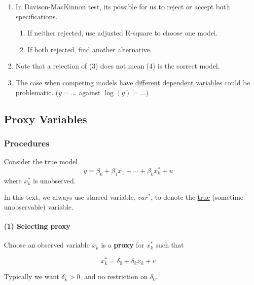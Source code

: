 \documentclass[]{article}
\begin{document}
			\begin{remark}[Porblems] \quad
				\begin{enumerate}
					\item In Davison-MacKinnon test, its possible for us to reject or accept both specifications.
					\begin{enumerate}
						\item If neither rejected, use adjusted R-square to choose one model.
						\item If both rejected, find another alternative.
					\end{enumerate}
					\item Note that a rejection of (3) does not mean (4) is the correct model.
					\item The case when competing models have \ul{different dependent variables} could be problematic. ($y = \dots $ against $\log(y) = \dots$)
				\end{enumerate}
			\end{remark}
		\subsection{Proxy Variables}
			\subsubsection{Procedures}
				\par Consider the true model
				\begin{equation}
					y = \beta_0 + \beta_1 x_1 + \cdots + \beta_k x_k^{*} + u
				\end{equation}
				where $x_k^{*}$ is unobserved.
				
				\begin{notation}
					In this text, we always use starred-variable, $var^*$, to denote the \ul{true} (sometime unobservable) variable.
				\end{notation}
				
				\paragraph{(1) Selecting proxy} Choose an observed variable $x_k$ is a \textbf{proxy} for $x_k^*$ such that
				
				\begin{equation}
					x_k^{*} = \delta_0 + \delta_k x_k + v
				\end{equation}
				\begin{remark}
					Typically we want $\delta_k > 0$, and no restriction on $\delta_0$.
				\end{remark}
				
\end{document}

